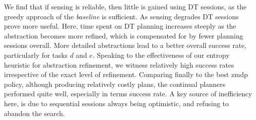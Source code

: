 We find that if sensing is reliable, then little is gained using DT
sessions, as the greedy approach of the {\em baseline} is
sufficient. As sensing degrades DT sessions prove more useful. Here,
time spent on DT planning increases steeply as the abstraction becomes
more refined, which is compensated for by fewer planning sessions
overall. More detailed abstractions lead to a better overall
success rate, particularly for tasks $d$ and $e$.
Speaking to the effectiveness of our entropy heuristic for abstraction
refinement, we witness relatively high success rates irrespective of
the exact level of refinement. Comparing finally to the best {\sc
zmdp} policy, although producing relatively costly plans, the
continual planners performed quite well, especially in terms success
rate. A key source of inefficiency here, is due to sequential sessions
always being optimistic, and refusing to abandon the search.

